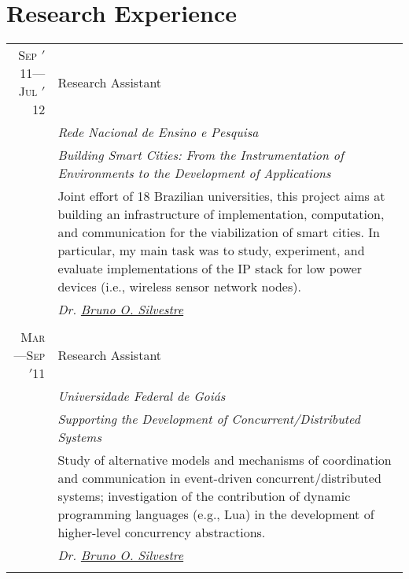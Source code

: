 \documentclass[a4paper,10pt]{article}
\begin{document}

\section{Research Experience}
\begin{tabular}{r|p{11cm}}

  \textsc{Sep $'$11---Jul $'$12}
  & Research Assistant \\
  &\emph{Rede Nacional de Ensino e Pesquisa}\\
  &\emph{Building Smart Cities: From the Instrumentation of Environments to the Development of Applications}\\
  &\footnotesize{Joint effort of 18 Brazilian universities, this project aims at building an infrastructure of 
    implementation, computation, and communication for the viabilization of smart cities. In particular, my main
    task was to study, experiment, and evaluate implementations of the IP stack for low power devices (i.e., 
    wireless sensor network nodes).}\\
  &\emph{Dr. \href{http://inf.ufg.br/~brunoos/}{Bruno O. Silvestre}}
  \\\multicolumn{2}{c}{} \\

  \textsc{Mar---Sep $'$11}
  & Research Assistant \\
  &\emph{Universidade Federal de Goiás}\\
  &\emph{Supporting the Development of Concurrent/Distributed Systems}\\
  &\indent \footnotesize{Study of alternative models and mechanisms of coordination and communication in event-driven
    concurrent/distributed systems; investigation of the contribution of dynamic programming 
    languages (e.g., Lua) in the development of higher-level concurrency abstractions.}\\
  &\emph{Dr. \href{http://inf.ufg.br/~brunoos/}{Bruno O. Silvestre}}
  \\\multicolumn{2}{c}{} \\

\end{tabular}

\nocite{salazar:1}

\renewcommand\refname{Publications} 



\end{document}
